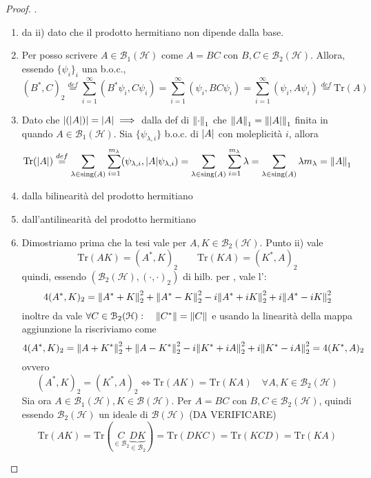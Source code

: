 \documentclass[a4paper,10pt]{article}
\theoremstyle{definition}
\newcommand{\hil}{\mathcal{H}} %
\theoremstyle{indentdefinition}
\theoremstyle{indenttheorem}
\theoremstyle{myremark}
\theoremstyle{indentgeneral}
\begin{document}
\begin{proof}
.
\begin{enumerate}
    \item da ii) dato che  il prodotto hermitiano non dipende dalla base.
    \item Per  posso scrivere $A\in\mathcal{B}_1(\hil)$ come $A=BC$ con $B,C\in\mathcal{B}_2(\hil)$. Allora, essendo $\{\psi_i\}_i$ una b.o.c.,
    $$(B^*,C)_2\overset{def}{=}\sum_{i=1}^\infty(B^*\psi_i,C\psi_i)=\sum_{i=1}^\infty(\psi_i,BC\psi_i)=\sum_{i=1}^\infty(\psi_i,A\psi_i)\overset{def}{=}\text{Tr}(A)$$
    \item Dato che $\abs{(\abs{A})}=\abs{A}\implies$ dalla def di $\norm{\cdot}_1$ che $\norm{A}_1=\norm{\abs{A}}_1$ finita in quando $A \in\mathcal{B}_1(\hil)$. Sia $\{\psi_{\lambda,i}\}$ b.o.c. di $\abs{A}$ con moleplicità $i$, allora
    $$\text{Tr}(\abs{A})\overset{def}{=}\sum_{\lambda\in\text{sing}(A)}\sum_{i=1}^{m_\lambda}(\psi_{\lambda,i},\abs{A}\psi_{\lambda,i})=\sum_{\lambda\in\text{sing}(A)}\sum_{i=1}^{m_\lambda}\lambda=\sum_{\lambda\in\text{sing}(A)}\lambda m_\lambda=\norm{A}_1$$
    \item dalla bilinearità del prodotto hermitiano
    \item dall'antilinearità del prodotto hermitiano
    \item Dimostriamo prima che la tesi vale per $A,K\in\mathcal{B}_2(\hil)$. Punto ii) vale
    $$\text{Tr}(AK)=(A^*,K)_2\qquad\text{Tr}(KA)=(K^*,A)_2$$
    quindi, essendo $(\mathcal{B}_2(\hil),(\cdot,\cdot)_2)$ di hilb. per , vale l':
    $$4(A^*,K)_2=\norm{A^*+K}_2^2+\norm{A^*-K}_2^2-i\norm{A^*+iK}_2^2+i\norm{A^*-iK}_2^2$$
    inoltre da  vale $\forall C\in\mathcal{B}_2(\hil):\quad \norm{C^*}=\norm{C}$ e usando la linearità della mappa aggiunzione la riscriviamo come
    $$4(A^*,K)_2=\norm{A+K^*}_2^2+\norm{A-K^*}_2^2-i\norm{K^*+iA}_2^2+i\norm{K^*-iA}_2^2=4(K^*,A)_2$$
    ovvero
    $$(A^*,K)_2=(K^*,A)_2\iff \text{Tr}(AK)=\text{Tr}(KA)\quad \forall A,K\in\mathcal{B}_2(\hil)$$
    Sia ora $A\in \mathcal{B}_1(\hil),K\in \mathcal{B}(\hil)$. Per  $A=BC$ con $B,C\in\mathcal{B}_2(\hil)$, quindi essendo $\mathcal{B}_2(\hil)$ un ideale di $\mathcal{B}(\hil)$ (DA VERIFICARE)
    $$\text{Tr}(AK)=\text{Tr}(\underset{\in\mathcal{B}_2}{C}\underbrace{DK}_{\in\mathcal{B}_2})=\text{Tr}(DKC)=\text{Tr}(KCD)=\text{Tr}(KA)$$
\end{enumerate}
\end{proof}
\end{document}
